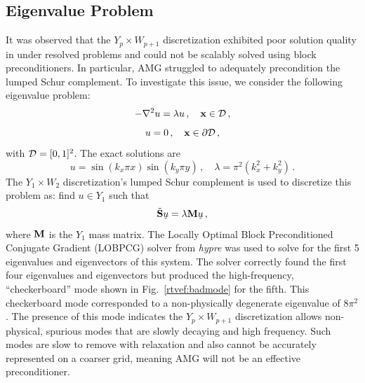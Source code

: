 \documentclass[../doc.tex]{subfiles}
\begin{document}
\subsection{Eigenvalue Problem} \label{rtvef_sec:badmodes}
It was observed that the $Y_p \times W_{p+1}$ discretization exhibited poor solution quality in under resolved problems and could not be scalably solved using block preconditioners. In particular, AMG struggled to adequately precondition the lumped Schur complement. To investigate this issue, we consider the following eigenvalue problem: 
	\begin{equation}
		-\nabla^2 u = \lambda u \,, \quad \boldsymbol{\mathrm{x}} \in \mathcal{D}\,, 
	\end{equation}
	\begin{equation}
		u = 0 \,, \quad \boldsymbol{\mathrm{x}} \in \partial \mathcal{D} \,,
	\end{equation}
with $\mathcal{D} = [0,1]^2$. 
The exact solutions are 
	\begin{equation}
		u = \sin(k_x \pi x) \sin(k_y \pi y) \,, \quad \lambda = \pi^2(k_x^2 + k_y^2) \,. 
	\end{equation}
The $Y_1 \times W_2$ discretization's lumped Schur complement is used to discretize this problem as: find $u \in Y_1$ such that 
	\begin{equation}
		\tilde{\boldsymbol{\mathrm{S}}} \,\underline{\!u\!}\, = \lambda \boldsymbol{\mathrm{M}} \,\underline{\!u\!}\, \,,
	\end{equation}
where $\boldsymbol{\mathrm{M}}$ is the $Y_1$ mass matrix. The Locally Optimal Block Preconditioned Conjugate Gradient (LOBPCG) solver from \emph{hypre} was used to solve for the first 5 eigenvalues and eigenvectors of this system. The solver correctly found the first four eigenvalues and eigenvectors but produced the high-frequency, ``checkerboard'' mode shown in Fig.~\ref{rtvef:badmode} for the fifth. This checkerboard mode corresponded to a non-physically degenerate eigenvalue of $8\pi^2$. The presence of this mode indicates the $Y_p \times W_{p+1}$ discretization allows non-physical, spurious modes that are slowly decaying and high frequency. Such modes are slow to remove with relaxation and also cannot be accurately represented on a coarser grid, meaning AMG will not be an effective preconditioner. 
\end{document}
